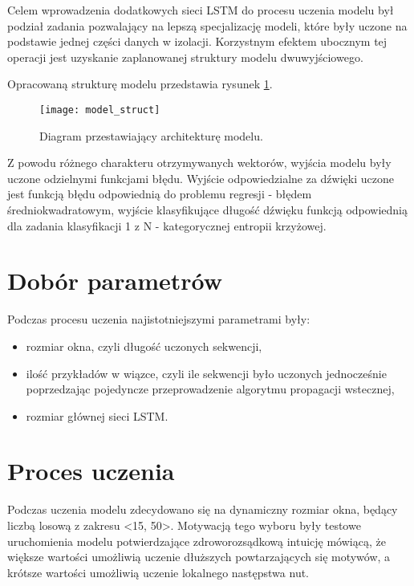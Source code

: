 {{        Celem wprowadzenia dodatkowych sieci LSTM do procesu uczenia modelu był podział zadania pozwalający na lepszą specjalizację modeli, które były uczone na podstawie jednej części danych w izolacji. Korzystnym efektem ubocznym tej operacji jest uzyskanie zaplanowanej struktury modelu dwuwyjściowego.

        Opracowaną strukturę modelu przedstawia rysunek \ref{model_struct}.
        
        \begin{figure}[H]
            \centering
            \texttt{[image: model\_struct]}
            \caption{Diagram przestawiający architekturę modelu.}
            \label{model_struct}
        \end{figure}

        Z powodu różnego charakteru otrzymywanych wektorów, wyjścia modelu były uczone odzielnymi funkcjami błędu. 
        Wyjście odpowiedzialne za dźwięki uczone jest funkcją błędu odpowiednią do problemu 
        regresji - błędem średniokwadratowym, wyjście klasyfikujące długość dźwięku funkcją odpowiednią
        dla zadania klasyfikacji 1 z\,\,N - kategorycznej entropii krzyżowej.
    }

    \section{Dobór parametrów}
    {
        Podczas procesu uczenia najistotniejszymi parametrami były:
        \begin{itemize}
            \setlength\itemsep{-0.5em}
            \item rozmiar okna, czyli długość uczonych sekwencji,
            \item ilość przykładów w\,\,wiązce, czyli ile sekwencji było uczonych jednocześnie
            poprzedzając pojedyncze przeprowadzenie algorytmu propagacji wstecznej,
            \item rozmiar głównej sieci LSTM.
        \end{itemize}
    }

    \section{Proces uczenia}
    {
        Podczas uczenia modelu zdecydowano się na dynamiczny rozmiar okna,
        będący liczbą losową z\,\,zakresu <15, 50>. Motywacją tego wyboru były testowe 
        uruchomienia modelu potwierdzające zdroworozsądkową intuicję mówiącą, że większe wartości
        umożliwią uczenie dłuższych powtarzających się motywów, a\,\,krótsze wartości umożliwią uczenie lokalnego następstwa nut.

}}

